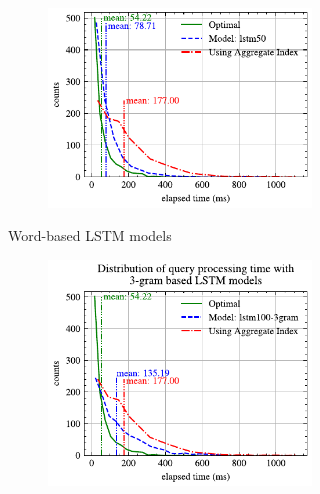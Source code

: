 \begin{figure}[!th]
\begin{subfigure}{0.45\textwidth}
\begin{subfigure}{\textwidth}
			\includegraphics[]{my/graphics/perf_dist_lstm50_B.pdf}
		\end{subfigure}
		\caption{Word-based LSTM models}
	\end{subfigure}
	\hfill
	\begin{subfigure}{0.45\textwidth}
		\begin{subfigure}{\textwidth}
			\centering
			\includegraphics[]{my/graphics/perf_dist_lstm100_3gram_B.pdf}
		\end{subfigure}
		\vfill
		\begin{subfigure}{\textwidth}
			\centering

\end{subfigure}
\end{subfigure}
\end{figure}
